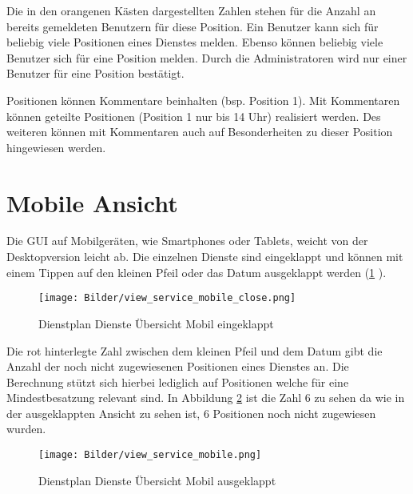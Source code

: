 \noindent Die in den orangenen Kästen dargestellten Zahlen stehen für die Anzahl an bereits gemeldeten Benutzern für diese Position. Ein Benutzer kann sich für beliebig viele Positionen eines Dienstes melden. Ebenso können beliebig viele Benutzer sich für eine Position melden. Durch die Administratoren wird nur einer Benutzer für eine Position bestätigt.

\noindent Positionen können Kommentare beinhalten (bsp. Position 1). Mit Kommentaren können geteilte Positionen (Position 1 nur bis 14 Uhr) realisiert werden. Des weiteren können mit Kommentaren auch auf Besonderheiten zu dieser Position hingewiesen werden.


\section{Mobile Ansicht}
\label{sec:dienste_mobile}
Die GUI auf Mobilgeräten, wie \zB Smartphones oder Tablets, weicht von der Desktopversion leicht ab. Die einzelnen Dienste sind eingeklappt und können mit einem Tippen auf den kleinen Pfeil oder das Datum ausgeklappt werden (\ref{fig:view_service_mobile_close} \textit{}). 


\begin{figure}[h]
 \begin{addmargin}{-0.2\linewidth}
   \centering 
   \texttt{[image: Bilder/view\_service\_mobile\_close.png]}
 \end{addmargin} 
 \caption[Dienste Übersicht Mobil]{Dienstplan Dienste Übersicht Mobil eingeklappt}
 \label{fig:view_service_mobile_close}
\end{figure}


\noindent Die rot hinterlegte Zahl zwischen dem kleinen Pfeil und dem Datum gibt die Anzahl der noch nicht zugewiesenen Positionen eines Dienstes an. Die Berechnung stützt sich hierbei lediglich auf Positionen welche für eine Mindestbesatzung relevant sind. In Abbildung \ref{fig:view_service_mobile} \textit{} ist die Zahl 6 zu sehen da wie in der ausgeklappten Ansicht zu sehen ist, 6 Positionen noch nicht zugewiesen wurden.

\begin{figure}[h]
 \begin{addmargin}{-0.2\linewidth}
   \centering 
   \texttt{[image: Bilder/view\_service\_mobile.png]}
 \end{addmargin} 
 \caption[Dienste Übersicht Mobil Ausgeklappt]{Dienstplan Dienste Übersicht Mobil ausgeklappt}
 \label{fig:view_service_mobile}
\end{figure}